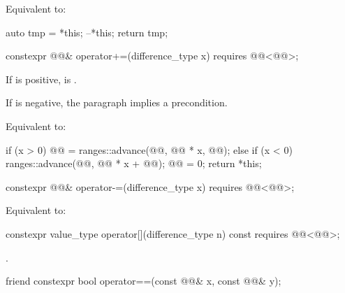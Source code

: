 \begin{itemdescr}
\pnum
\effects
Equivalent to:
\begin{codeblock}
auto tmp = *this;
--*this;
return tmp;
\end{codeblock}
\end{itemdescr}

\begin{itemdecl}
constexpr @@& operator+=(difference_type x)
  requires @@<@@>;
\end{itemdecl}

\begin{itemdescr}
\pnum
\expects
If  is positive,
is .
\begin{note}
If  is negative, the  paragraph implies a precondition.
\end{note}

\pnum
\effects
Equivalent to:
\begin{codeblock}
if (x > 0) {
  @@ = ranges::advance(@@, @@ * x, @@);
} else if (x < 0) {
  ranges::advance(@@, @@ * x + @@);
  @@ = 0;
}
return *this;
\end{codeblock}
\end{itemdescr}

\begin{itemdecl}
constexpr @@& operator-=(difference_type x)
  requires @@<@@>;
\end{itemdecl}

\begin{itemdescr}
\pnum
\effects
Equivalent to: 
\end{itemdescr}

\begin{itemdecl}
constexpr value_type operator[](difference_type n) const
  requires @@<@@>;
\end{itemdecl}

\begin{itemdescr}
\pnum
\returns
{}.
\end{itemdescr}

\begin{itemdecl}
friend constexpr bool operator==(const @@& x, const @@& y);
\end{itemdecl}

